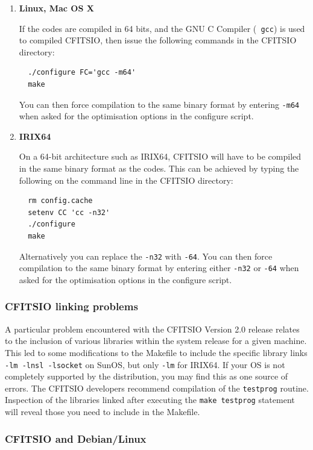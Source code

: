 \documentclass[12pt,twoside]{article}
\begin{document}
\begin{enumerate}
%
\item {\bf Linux, Mac OS X}

If the \healpix codes are compiled in 64 bits, and the GNU C Compiler ({\tt
gcc}) is used to compiled CFITSIO, then issue the following commands in the
CFITSIO directory:

\begin{verbatim}
  ./configure FC='gcc -m64'
  make
\end{verbatim}

You can
then force compilation to the same binary format by entering
{\tt -m64} when asked for the optimisation options in the
\healpix configure script.

\item {\bf IRIX64}

On a 64-bit architecture such as IRIX64, CFITSIO will have to be
compiled in the same  binary format as the \healpix codes.
This can be achieved by typing the
following on the
command line in the CFITSIO directory:
 
\begin{verbatim}
  rm config.cache    
  setenv CC 'cc -n32'
  ./configure
  make
\end{verbatim}

Alternatively you can replace the {\tt -n32} with {\tt -64}. You can
then force compilation to the same binary format by entering either
{\tt -n32} or {\tt -64} when asked for the optimisation options in the
\healpix configure script.
%
\end{enumerate}

\subsubsection*{CFITSIO linking problems}

A particular problem encountered with the CFITSIO Version 2.0 release relates
to the inclusion of various libraries within the system release for a given
machine. This led to some modifications to the Makefile to include the specific
library links {\tt -lm -lnsl -lsocket} on SunOS, but only {\tt -lm} for IRIX64.
If your OS is not completely supported by the distribution, you may find this
as one source of errors. The CFITSIO developers recommend compilation of the
{\tt testprog} routine. Inspection of the libraries linked after executing the
{\tt make testprog} statement will reveal those you need to include in the
Makefile.

\subsubsection*{CFITSIO and Debian/Linux}
\end{document}

